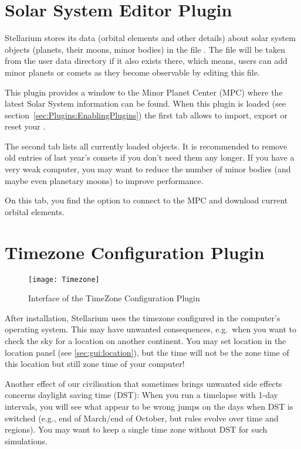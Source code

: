 \newpage

\section{Solar System Editor Plugin}
\label{sec:plugins:SolarSystemEditor}

Stellarium stores its data (orbital elements and other details) about
solar system objects (planets, their moons, minor bodies) in the file
. The file will be taken from the user data
directory if it also exists there, which means, users can add minor
planets or comets as they become observable by editing this file.


This plugin provides a window to the Minor Planet Center (MPC) where the
latest Solar System information can be found. When this plugin is
loaded (see section~\ref{sec:Plugins:EnablingPlugins}) the first tab
allows to import, export or reset your .

The second tab lists all currently loaded objects.  It is recommended
to remove old entries of last year's comets if you don't need them any
longer.
If you have a very weak computer, you may want to reduce the number of
minor bodies (and maybe even planetary moons) to improve performance.

On this tab, you find the option to connect to the MPC and download current orbital elements. 


\newpage

\section{Timezone Configuration Plugin}
\label{sec:plugins:Timezones}


\begin{figure}[h]\centering
\texttt{[image: Timezone]}
\label{fig:plugins:Timezones}
\caption{Interface of the TimeZone Configuration Plugin}
\end{figure}


\noindent After installation, Stellarium uses the timezone configured in the
computer's operating system. This may have unwanted consequences,
e.g.\ when you want to check the sky for a location on another
continent. You may set location in the location panel (see
\ref{sec:gui:location}), but the time will not be the zone time of
this location but still zone time of your computer!

Another effect of our civilisation that sometimes brings unwanted side
effects concerns daylight saving time (DST): When you run a timelapse
with 1-day intervals, you will see what appear to be wrong jumps on
the days when DST is switched (e.g., end of March/end of October, but
rules evolve over time and regions). You may want to keep a single
time zone without DST for such simulations.


